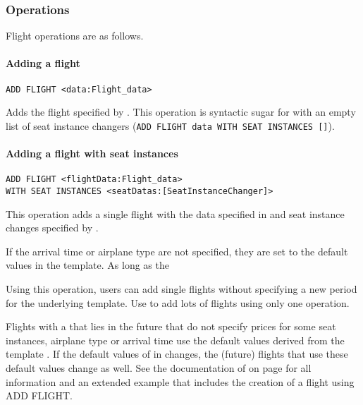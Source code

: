 \subsubsection{Operations}
Flight operations are as follows.


\paragraph{Adding a flight}
\begin{operation}
  \begin{lstlisting}
ADD FLIGHT <data:Flight_data>
  \end{lstlisting}
\end{operation}
Adds the flight specified by .
This operation is syntactic sugar for  with an empty list
of seat instance changers (\lstinline|ADD FLIGHT data WITH SEAT INSTANCES []|).





\paragraph{Adding a flight with seat instances}
\begin{operation}
  \label{op:add_flight}
  \begin{lstlisting}
ADD FLIGHT <flightData:Flight_data>
WITH SEAT INSTANCES <seatDatas:[SeatInstanceChanger]>
  \end{lstlisting}
\end{operation}
This operation adds a single flight with the data specified in 
and seat instance changes specified by .

If the arrival time or airplane type are not specified, they are set to the
default values in the template. As long as the 

Using this operation, users can add single flights without specifying a new
period for the underlying template. Use  to add lots of
flights using only one operation.

Flights with a  that lies in the future that do not specify
prices for some seat instances, airplane type or arrival time use the default
values derived from the template . If the default values of
in  changes, the (future) flights that use these default
values change as well. See the documentation of  on
page \pageref{op:change_template} for all information and an extended example
that includes the creation of a flight using ADD FLIGHT.

